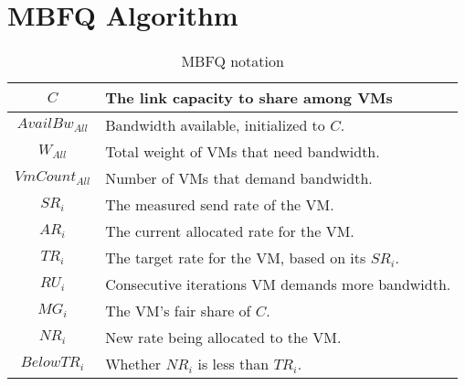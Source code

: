 \section{MBFQ Algorithm}
\label{sec:algorithm}

\begin{table}[t]
{\footnotesize
\begin{tabular}{ | c | p{6cm} | }
  \hline
  $C$ & The link capacity to share among VMs \\ \hline
  $AvailBw_{All}$ & Bandwidth available, initialized to $C$. \\ \hline
  $W_{All}$ & Total weight of VMs that need bandwidth. \\ \hline
  $VmCount_{All}$ & Number of VMs that demand bandwidth. \\ \hline 
  $SR_{i}$ & The measured send rate of the VM. \\ \hline
  $AR_{i}$ & The current allocated rate for the VM. \\ \hline
  $TR_{i}$ & The target rate for the VM, based on its $SR_{i}$. \\ \hline
  $RU_{i}$ & Consecutive iterations VM demands more bandwidth. \\ \hline
  $MG_{i} $ & The VM's fair share of $C$. \\ \hline
  $NR_{i}$ & New rate being allocated to the VM.   \\ \hline
  $BelowTR_{i}$ & Whether $NR_{i}$ is less than $TR_{i}$. \\ \hline
\end{tabular}
}
\vspace{-1em}
\caption{MBFQ notation}
\vspace{-1em}
\label{table:mbfq_init}
\end{table}

